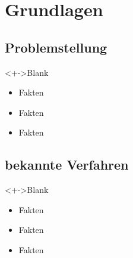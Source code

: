 \section{Grundlagen}

\subsection{Problemstellung}

\begin{frame}{\insertsubsection}
  \begin{block}<+->{Blank}
    \begin{itemize}
      \item Fakten
      \item Fakten
      \item Fakten \cite{zhang17}
    \end{itemize}
  \end{block}
\end{frame}

\subsection{bekannte Verfahren}

\begin{frame}{\insertsubsection}
  \begin{block}<+->{Blank}
    \begin{itemize}
      \item Fakten
      \item Fakten
      \item Fakten
    \end{itemize}
  \end{block}
\end{frame}
